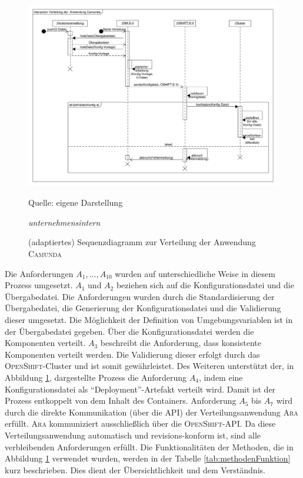 \begin{figure}[h!]
	\centering
	\includegraphics[scale=0.39]{img/prozessDeploymentCamunda.pdf}
	\caption{(adaptiertes) Sequenzdiagramm zur Verteilung der Anwendung \textsc{Camunda}}
	{\footnotesize Quelle: eigene Darstellung \par \textit{unternehmensintern}}
	\label{abb:prozessDeploymentCamunda}
\end{figure}
Die Anforderungen $A_{1}, ..., A_{10}$ wurden auf unterschiedliche Weise in diesem Prozess umgesetzt. $A_{1}$ und $A_{2}$ beziehen sich auf die Konfigurationsdatei und die Übergabedatei. Die Anforderungen wurden durch die Standardisierung der Übergabedatei, die Generierung der Konfigurationsdatei und die Validierung dieser umgesetzt. Die Möglichkeit der Definition von Umgebungsvariablen ist in der Übergabedatei gegeben. Über die Konfigurationsdatei werden die Komponenten verteilt. $A_{3}$ beschreibt die Anforderung, dass konsistente Komponenten verteilt werden. Die Validierung dieser erfolgt durch das \textsc{OpenShift}-Cluster und ist somit gewährleistet. Des Weiteren unterstützt der, in Abbildung \ref{abb:prozessDeploymentCamunda}, dargestellte Prozess die Anforderung $A_{4}$, indem eine Konfigurationsdatei als \enquote{Deployment}-Artefakt verteilt wird. Damit ist der Prozess entkoppelt von dem Inhalt des Containers. Anforderung $A_{5}$ bis $A_{7}$ wird durch die direkte Kommunikation (über die \ac{API}) der Verteilungsanwendung \textsc{Ara} erfüllt. \textsc{Ara} kommuniziert ausschließlich über die \textsc{OpenShift}-\ac{API}. Da diese Verteilungsanwendung automatisch und revisions-konform ist, sind alle verbleibenden Anforderungen erfüllt. Die Funktionalitäten der Methoden, die in Abbildung \ref{abb:prozessDeploymentCamunda} verwendet wurden, werden in der Tabelle \vref{tab:methodenFunktion} kurz beschrieben. Dies dient der Übersichtlichkeit und dem Verständnis. 

